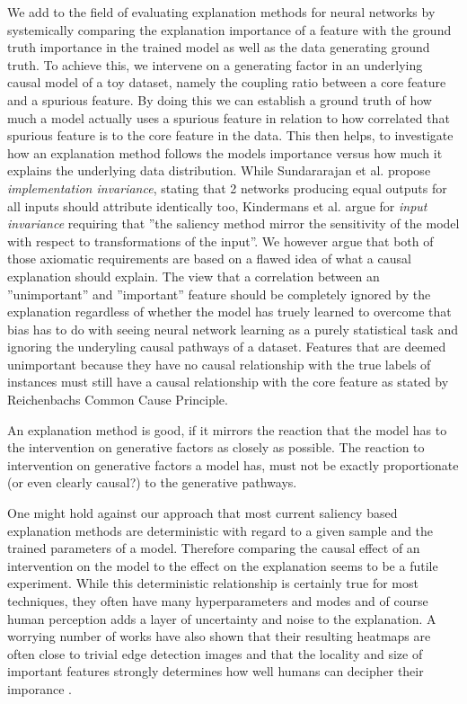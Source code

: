 {We add to the field of evaluating explanation methods for neural networks by systemically comparing the explanation importance of a feature with the ground truth importance in the trained model as well as the data generating ground truth. To achieve this, we intervene on a generating factor in an underlying causal model of a toy dataset, namely the coupling ratio between a core feature and a spurious feature. By doing this we can establish a ground truth of how much a model actually uses a spurious feature in relation to how correlated that spurious feature is to the core feature in the data. This then helps, to investigate how an explanation method follows the models importance versus how much it explains the underlying data distribution. While Sundararajan et al. \cite{Sundararajan2017} propose \textit{implementation invariance}, stating that 2 networks producing equal outputs for all inputs should attribute identically too, Kindermans et al. \cite{Kindermans2019} argue for \textit{input invariance} requiring that ''the saliency method mirror the sensitivity of the model with respect to transformations of the input''.
We however argue that both of those axiomatic requirements are based on a flawed idea of what a causal explanation should explain. 
The view that a correlation between an ''unimportant'' and ''important'' feature should be completely ignored by the explanation regardless of whether the model has truely learned to overcome that bias has to do with seeing neural network learning as a purely statistical task and ignoring the underyling causal pathways of a dataset. 
Features that are deemed unimportant because they have no causal relationship with the true labels of instances must still have a causal relationship with the core feature as stated by Reichenbachs Common Cause Principle. 

An explanation method is good, if it mirrors the reaction that the model has to the intervention on generative factors as closely as possible. The reaction to intervention on generative factors a model has, must not be exactly proportionate (or even clearly causal?) to the generative pathways.

One might hold against our approach that most current saliency based explanation methods are deterministic with regard to a given sample and the trained parameters of a model. Therefore comparing the causal effect of an intervention on the model to the effect on the explanation seems to be a futile experiment. While this deterministic relationship is certainly true for most techniques, they often have many hyperparameters and modes and of course human perception adds a layer of uncertainty and noise to the explanation. A worrying number of works  have also shown that their resulting heatmaps are often close to trivial edge detection images  and that the locality and size of important features strongly determines how well humans can decipher their imporance .


}

